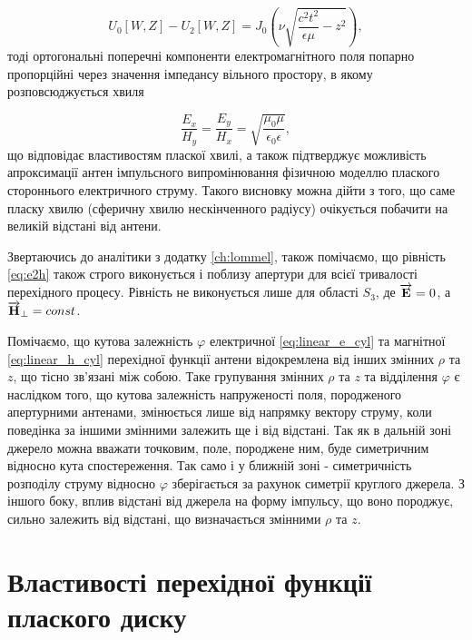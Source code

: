 \begin{equation*}
U_0[ W, Z ] - U_2[ W, Z ] = 
J_0 \left( \nu \sqrt{\frac{c^2t^2}{\epsilon \mu}  - z^2} \right),
\end{equation*}
%
тоді ортогональні поперечні компоненти електромагнітного поля попарно 
пропорційні через значення імпедансу вільного простору, в якому 
розповсюджується хвиля

\begin{equation} \label{eq:e2h}
\frac{E_x}{H_y} = \frac{E_y}{H_x} = 
\sqrt{\frac{\mu_0 \mu}{\epsilon_0 \epsilon}},
\end{equation}
%
що відповідає властивостям пласкої хвилі, а також підтверджує можливість 
апроксимації антен імпульсного випромінювання фізичною моделлю плаского 
стороннього електричного струму. Такого висновку можна дійти з того, що
саме пласку хвилю (сферичну хвилю нескінченного радіусу) очікується побачити 
на великій відстані від антени.

Звертаючись до аналітики з додатку \ref{ch:lommel}, також помічаємо, що 
рівність \eqref{eq:e2h} також строго виконується і поблизу апертури для 
всієї тривалості перехідного процесу. Рівність не виконується лише для 
області $ S_3 $, де $ \overrightarrow{\mathbf E} = 0 $, а $ \overrightarrow{\mathbf H}_\perp = const $.

Помічаємо, що кутова залежність $ \varphi $ електричної 
\eqref{eq:linear_e_cyl} та магнітної \eqref{eq:linear_h_cyl} перехідної 
функції антени відокремлена від інших змінних $ \rho $ та $ z $, що тісно 
зв'язані між собою. Таке групування змінних $ \rho $ та $ z $ та відділення 
$ \varphi $ є наслідком того, що кутова залежність напруженості поля, 
породженого апертурними антенами, змінюється лише від напрямку вектору 
струму, коли поведінка за іншими змінними залежить ще і від відстані.
Так як в дальній зоні джерело можна вважати точковим, поле, породжене ним, 
буде симетричним відносно кута спостереження. Так само і у ближній зоні -
симетричність розподілу струму відносно $ \varphi $ зберігається за рахунок
симетрії круглого джерела. З іншого боку, вплив відстані від джерела на 
форму імпульсу, що воно породжує, сильно залежить від відстані, що 
визначається змінними $ \rho $ та $ z $.

\section{Властивості перехідної функції плаского диску}

